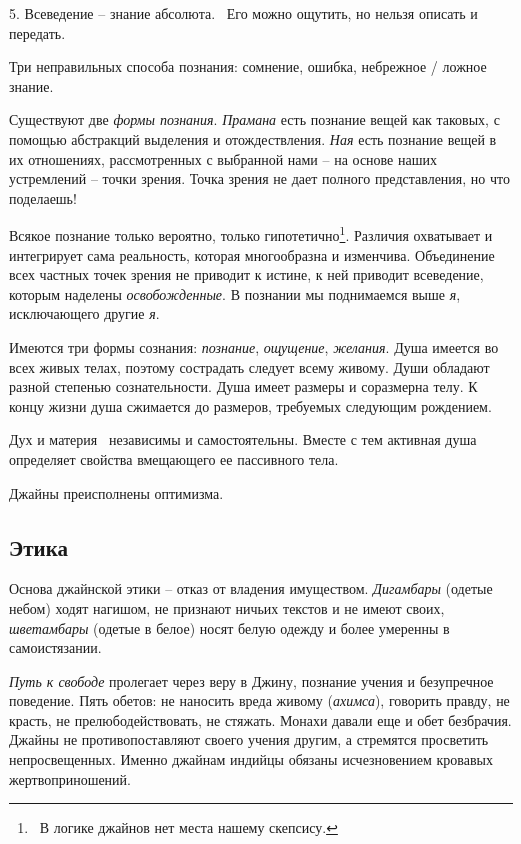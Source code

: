 \documentclass[a4paper]{article}
\begin{document}
{
5. Всеведение – знание абсолюта. \ Его можно ощутить, но нельзя описать и передать.}

{
Три неправильных способа познания: сомнение, ошибка, небрежное / ложное знание.}

{
Существуют две \textit{формы познания}. \textit{Прамана} есть познание вещей как таковых, с помощью абстракций выделения
и отождествления. \textit{Ная} есть познание вещей в их отношениях, рассмотренных с выбранной нами – на основе наших
устремлений – точки зрения. Точка зрения не дает полного представления, но что поделаешь!}

{
Всякое познание только вероятно, только гипотетично\footnote{\foreignlanguage{russian}{\ В логике джайнов нет места
нашему скепсису.}}. Различия охватывает и интегрирует сама реальность, которая многообразна и изменчива. Объединение
всех частных точек зрения не приводит к истине, к ней приводит всеведение, которым наделены \textit{освобожденные}. В
познании мы поднимаемся выше \textit{я}, исключающего другие \textit{я}.}

{
Имеются три формы сознания: \textit{познание}, \textit{ощущение}, \textit{желания}. Душа имеется во всех живых телах,
поэтому сострадать следует всему живому. Души обладают разной степенью сознательности. Душа имеет размеры и соразмерна
телу. К концу жизни душа сжимается до размеров, требуемых следующим рождением. }

{
Дух и материя \ независимы и самостоятельны. Вместе с тем активная душа определяет свойства вмещающего ее пассивного
тела.}

{
Джайны преисполнены оптимизма.}

\subsection[Этика]{ Этика}
{
Основа джайнской этики – отказ от владения имуществом. \textit{Дигамбары} (одетые небом) ходят нагишом, не признают
ничьих текстов и не имеют своих, \textit{шветамбары} (одетые в белое) носят белую одежду и более умеренны в
самоистязании.}

{
\textit{Путь к свободе} пролегает через веру в Джину, познание учения и безупречное поведение. Пять обетов: не наносить
вреда живому (\textit{ахимса}), говорить правду, не красть, не прелюбодействовать, не стяжать. Монахи давали еще и обет
безбрачия. Джайны не противопоставляют своего учения другим, а стремятся просветить непросвещенных. Именно джайнам
индийцы обязаны исчезновением кровавых жертвоприношений. }
\end{document}
